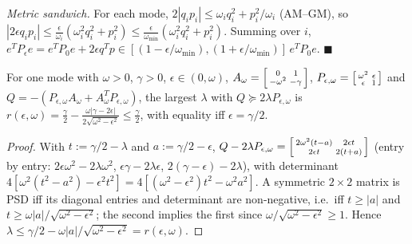 \emph{Metric sandwich.} For each mode, \(2|q_ip_i| \le \omega_iq_i^2 + p_i^2/\omega_i\) (AM--GM), so \(|2\epsilon q_ip_i| \le \frac{\epsilon}{\omega_i}(\omega_i^2q_i^2 + p_i^2) \le \frac{\epsilon}{\omega_{\min}}(\omega_i^2q_i^2 + p_i^2)\). Summing over \(i\), \(e^TP_\epsilon e = e^TP_0e + 2\epsilon q^Tp \in [(1 - \epsilon/\omega_{\min}), (1 + \epsilon/\omega_{\min})]\,e^TP_0e\). \hfill \(\blacksquare\)

\begin{lemma}
\label{lem:pencil_rate}
For one mode with \(\omega > 0\), \(\gamma > 0\), \(\epsilon \in (0,\omega)\), \(A_\omega = \begin{bsmallmatrix} 0 & 1 \\ -\omega^2 & -\gamma \end{bsmallmatrix}\), \(P_{\epsilon,\omega} = \begin{bsmallmatrix} \omega^2 & \epsilon \\ \epsilon & 1\end{bsmallmatrix}\) and \(Q = -(P_{\epsilon,\omega}A_\omega + A_\omega^TP_{\epsilon,\omega})\), the largest \(\lambda\) with \(Q \succeq 2\lambda P_{\epsilon,\omega}\) is
\(r(\epsilon,\omega) = \frac{\gamma}{2} - \frac{\omega|\gamma - 2\epsilon|}{2\sqrt{\omega^2 - \epsilon^2}} \le \frac{\gamma}{2}\), with equality iff \(\epsilon = \gamma/2\).
\end{lemma}
\begin{proof}
With \(t := \gamma/2 - \lambda\) and \(a := \gamma/2 - \epsilon\), \(Q - 2\lambda P_{\epsilon,\omega} = \begin{bsmallmatrix} 2\omega^2(t - a) & 2\epsilon t \\ 2\epsilon t & 2(t + a)\end{bsmallmatrix}\) (entry by entry: \(2\epsilon\omega^2 - 2\lambda\omega^2\), \(\epsilon\gamma - 2\lambda\epsilon\), \(2(\gamma - \epsilon) - 2\lambda\)), with determinant \(4[\omega^2(t^2 - a^2) - \epsilon^2t^2] = 4[(\omega^2 - \epsilon^2)t^2 - \omega^2a^2]\). A symmetric \(2\times2\) matrix is PSD iff its diagonal entries and determinant are non-negative, i.e.\ iff \(t \ge |a|\) and \(t \ge \omega|a|/\sqrt{\omega^2 - \epsilon^2}\); the second implies the first since \(\omega/\sqrt{\omega^2 - \epsilon^2} \ge 1\). Hence \(\lambda \le \gamma/2 - \omega|a|/\sqrt{\omega^2-\epsilon^2} = r(\epsilon,\omega)\).
\end{proof}

